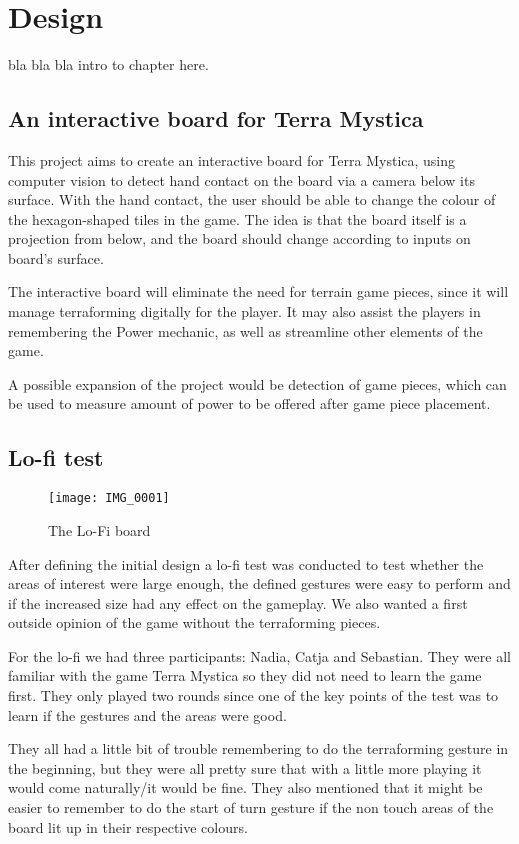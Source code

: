 \chapter{Design}\label{ch:design}
bla bla bla intro to chapter here.

\section{An interactive board for Terra Mystica}
This project aims to create an interactive board for Terra Mystica, using computer vision to detect hand contact on the board via a camera below its surface. With the hand contact, the user should be able to change the colour of the hexagon-shaped tiles in the game. The idea is that the board itself is a projection from below, and the board should change according to inputs on board's surface.

The interactive board will eliminate the need for terrain game pieces, since it will manage terraforming digitally for the player. It may also assist the players in remembering the Power mechanic, as well as streamline other elements of the game.

A possible expansion of the project would be detection of game pieces, which can be used to measure amount of power to be offered after game piece placement.

\section{Lo-fi test}
\begin{figure}
\centering
\texttt{[image: IMG\_0001]}
\caption{The Lo-Fi board}
\end{figure}

After defining the initial design a lo-fi test was conducted to test whether the areas of interest were large enough, the defined gestures were easy to perform and if the increased size had any effect on the gameplay. We also wanted a first outside opinion of the game without the terraforming pieces. 

For the lo-fi we had three participants: Nadia, Catja and Sebastian.  
They were all familiar with the game Terra Mystica so they did not need to learn the game first. They only played two rounds since one of the key points of the test was to learn if the gestures and the areas were good. 

They all had a little bit of trouble remembering to do the terraforming gesture in the beginning, but they were all pretty sure that with a little more playing it would come naturally/it would be fine. They also mentioned that it might be easier to remember to do the start of turn gesture if the non touch areas of the board lit up in their respective colours. 

